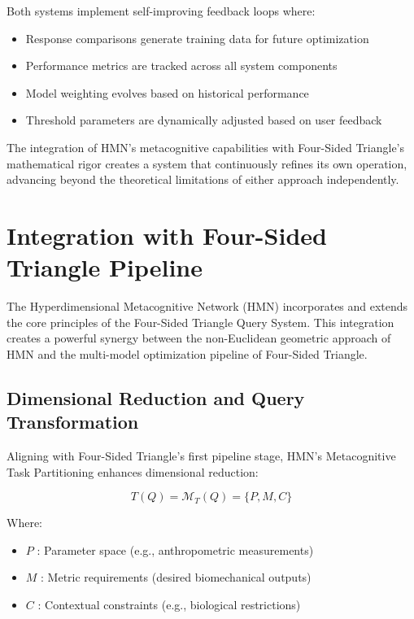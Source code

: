 \documentclass[journal,onecolumn]{IEEEtran}
\begin{document}
Both systems implement self-improving feedback loops where:
\begin{itemize}
\item Response comparisons generate training data for future optimization
\item Performance metrics are tracked across all system components
\item Model weighting evolves based on historical performance
\item Threshold parameters are dynamically adjusted based on user feedback
\end{itemize}

The integration of HMN's metacognitive capabilities with Four-Sided Triangle's mathematical rigor creates a system that continuously refines its own operation, advancing beyond the theoretical limitations of either approach independently.

\section{Integration with Four-Sided Triangle Pipeline}

The Hyperdimensional Metacognitive Network (HMN) incorporates and extends the core principles of the Four-Sided Triangle Query System. This integration creates a powerful synergy between the non-Euclidean geometric approach of HMN and the multi-model optimization pipeline of Four-Sided Triangle.

\subsection{Dimensional Reduction and Query Transformation}

Aligning with Four-Sided Triangle's first pipeline stage, HMN's Metacognitive Task Partitioning enhances dimensional reduction:

\begin{equation}
T(Q) = \mathcal{M}_T(Q) = \{P, M, C\}
\end{equation}

Where:
\begin{itemize}
\item $P$ : Parameter space (e.g., anthropometric measurements)
\item $M$ : Metric requirements (desired biomechanical outputs)
\item $C$ : Contextual constraints (e.g., biological restrictions)
\end{itemize}
\end{document}
